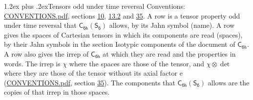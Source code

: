 \documentclass[10pt,a4paper]{article}
\makeatletter
\renewcommand\section{\@startsection{section}{1}{\z@}{-3ex plus -1ex minus -.2ex}%
  {1.2ex plus .2ex}{\normalfont\large\sffamily\bfseries\color{parttitle}}}
\numberwithin{equation}{section}
\newcommand{\grp}[1]{\mathsf{#1}}
\newcommand{\irrprod}{\otimes}
\makeatother
\begin{document}
\section{Tensors odd under time reversal}\label{s:time_odd}
Conventions: \href{../../CONVENTIONS.pdf}{CONVENTIONS.pdf}, sections \href{../../../rotation/CONVENTIONS.pdf\#conv.10}{10}, \href{../../../rotation/CONVENTIONS.pdf\#conv.13.2}{13.2} and \href{../../CONVENTIONS.pdf\#conv.35}{35}.
\leavevmode\label{n:head.name.property}A row is a tensor property odd under time reversal that $\grp{C_{6h}}(\grp{S_{6}})$ allows, by its Jahn symbol (name). \label{n:head.spaces}A row gives the spaces of Cartesian tensors in which its components are read (spaces), by their Jahn symbols in the section Isotypic components of the document of \href{../../../rotation/data/pdf/C6h.pdf}{$\grp{C_{6h}}$}. \label{n:head.properties}A row also gives the irrep of $\grp{C_{6h}}$ at which they are read and the properties in words. The irrep is $\chi$ where the spaces are those of the tensor, and $\chi \irrprod \det$ where they are those of the tensor without its axial factor e (\href{../../CONVENTIONS.pdf}{CONVENTIONS.pdf}, section \href{../../CONVENTIONS.pdf\#conv.35}{35}). The components that $\grp{C_{6h}}(\grp{S_{6}})$ allows are the copies of that irrep in those spaces.
\end{document}
